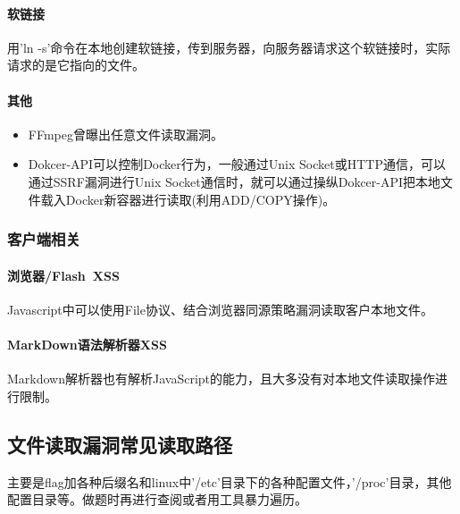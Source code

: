 \paragraph*{软链接}
用'ln -s'命令在本地创建软链接，传到服务器，向服务器请求这个软链接时，实际请求的是它指向的文件。

\paragraph*{其他}
\begin{itemize}
    \item FFmpeg曾曝出任意文件读取漏洞。
    \item Dokcer-API可以控制Docker行为，一般通过Unix Socket或HTTP通信，可以通过SSRF漏洞进行Unix Socket通信时，就可以通过操纵Dokcer-API把本地文件载入Docker新容器进行读取(利用ADD/COPY操作)。
\end{itemize}

\subsubsection*{客户端相关}
\paragraph*{浏览器/Flash\ XSS}
Javascript中可以使用File协议、结合浏览器同源策略漏洞读取客户本地文件。

\paragraph*{MarkDown语法解析器XSS}
Markdown解析器也有解析JavaScript的能力，且大多没有对本地文件读取操作进行限制。

\subsection{文件读取漏洞常见读取路径}
主要是flag加各种后缀名和linux中'/etc'目录下的各种配置文件，'/proc'目录，其他配置目录等。做题时再进行查阅或者用工具暴力遍历。